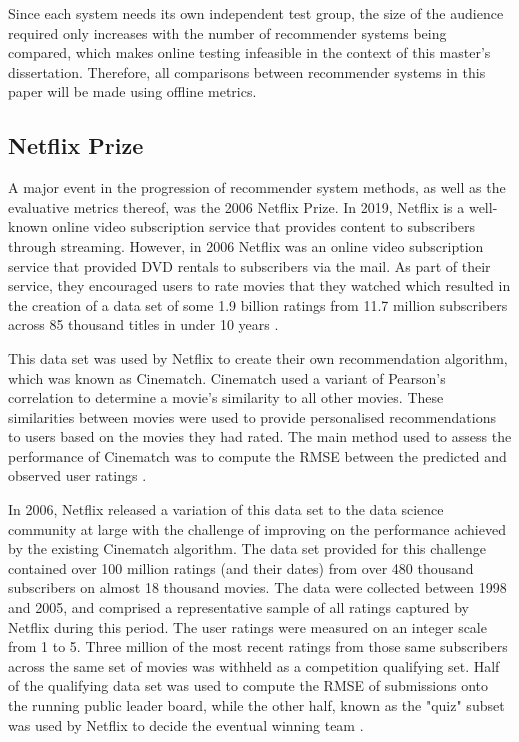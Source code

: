 Since each system needs its own independent test group, the size of the audience required only increases with the number of recommender systems being compared, which makes online testing infeasible in the context of this master's dissertation. Therefore, all comparisons between recommender systems in this paper will be made using offline metrics.

\subsection{Netflix Prize}
A major event in the progression of recommender system methods, as well as the evaluative metrics thereof, was the 2006 Netflix Prize. In 2019, Netflix is a well-known online video subscription service that provides content to subscribers through streaming. However, in 2006 Netflix was an online video subscription service that provided DVD rentals to subscribers via the mail. As part of their service, they encouraged users to rate movies that they watched which resulted in the creation of a data set of some 1.9 billion ratings from 11.7 million subscribers across 85 thousand titles in under 10 years \parencite{netflix_description}.

This data set was used by Netflix to create their own recommendation algorithm, which was known as Cinematch. Cinematch used a variant of Pearson's correlation to determine a movie's similarity to all other movies. These similarities between movies were used to provide personalised recommendations to users based on the movies they had rated. The main method used to assess the performance of Cinematch was to compute the RMSE between the predicted and observed user ratings \parencite{netflix_description}.

In 2006, Netflix released a variation of this data set to the data science community at large with the challenge of improving on the performance achieved by the existing Cinematch algorithm. The data set provided for this challenge contained over 100 million ratings (and their dates) from over 480 thousand subscribers on almost 18 thousand movies. The data were collected between 1998 and 2005, and comprised a representative sample of all ratings captured by Netflix during this period. The user ratings were measured on an integer scale from 1 to 5. Three million of the most recent ratings from those same subscribers across the same set of movies was withheld as a competition qualifying set. Half of the qualifying data set was used to compute the RMSE of submissions onto the running public leader board, while the other half, known as the "quiz" subset was used by Netflix to decide the eventual winning team \parencite{netflix_description}.

